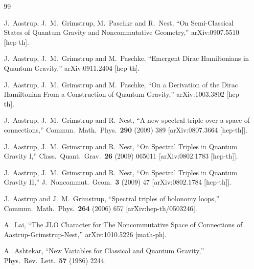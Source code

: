 \documentclass[12pt]{article}
\begin{document}
\begin{thebibliography}{99}




  J.~Aastrup, J.~M.~Grimstrup, M.~Paschke and R.~Nest,
  ``On Semi-Classical States of Quantum Gravity and Noncommutative Geometry,''
  arXiv:0907.5510 [hep-th].


  J.~Aastrup, J.~M.~Grimstrup and M.~Paschke,
  ``Emergent Dirac Hamiltonians in Quantum Gravity,''
  arXiv:0911.2404 [hep-th].



  J.~Aastrup, J.~M.~Grimstrup and M.~Paschke,
  ``On a Derivation of the Dirac Hamiltonian From a Construction of Quantum
  Gravity,''
  arXiv:1003.3802 [hep-th].





  J.~Aastrup, J.~M.~Grimstrup and R.~Nest,
  ``A new spectral triple over a space of connections,''
  Commun.\ Math.\ Phys.\  {\bf 290} (2009) 389
  [arXiv:0807.3664 [hep-th]].





  J.~Aastrup, J.~M.~Grimstrup and R.~Nest,
  ``On Spectral Triples in Quantum Gravity I,''
  Class.\ Quant.\ Grav.\  {\bf 26} (2009) 065011
  [arXiv:0802.1783 [hep-th]].



  J.~Aastrup, J.~M.~Grimstrup and R.~Nest,
  ``On Spectral Triples in Quantum Gravity II,''
  J.\ Noncommut.\ Geom.\  {\bf 3} (2009) 47
  [arXiv:0802.1784 [hep-th]].


  J.~Aastrup and J.~M.~Grimstrup,
  ``Spectral triples of holonomy loops,''
  Commun.\ Math.\ Phys.\  {\bf 264} (2006) 657
  [arXiv:hep-th/0503246].



  A.~Lai,
  ``The JLO Character for The Noncommutative Space of Connections of
  Aastrup-Grimstrup-Nest,''
  arXiv:1010.5226 [math-ph].


  A.~Ashtekar,
  ``New Variables for Classical and Quantum Gravity,''
  Phys.\ Rev.\ Lett.\  {\bf 57} (1986) 2244.


\end{thebibliography}
\end{document}

